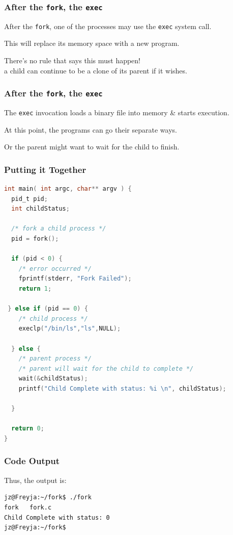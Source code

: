 \begin{frame}
	\frametitle{After the \texttt{fork}, the \texttt{exec}}


	After the \texttt{fork}, one of the processes may use the \texttt{exec} system call.

	This will replace its memory space with a new program.

	There's no rule that says this must happen!\\
	\quad a child can continue to be a clone of its parent if it wishes.
	
\end{frame}

\begin{frame}
	\frametitle{After the \texttt{fork}, the \texttt{exec}}


	The \texttt{exec} invocation loads a binary file into memory \& starts execution.

	At this point, the programs can go their separate ways.

	Or the parent might want to wait for the child to finish.


\end{frame}

\begin{frame}[fragile]
	\frametitle{Putting it Together}

	{\scriptsize
		\begin{lstlisting}[language=C]
int main( int argc, char** argv ) {
  pid_t pid;
  int childStatus;

  /* fork a child process */
  pid = fork();
  
  if (pid < 0) { 
    /* error occurred */ 
    fprintf(stderr, "Fork Failed"); 
    return 1;
  
 } else if (pid == 0) {    
    /* child process */
    execlp("/bin/ls","ls",NULL);
    
  } else {    
    /* parent process */
    /* parent will wait for the child to complete */
    wait(&childStatus);
    printf("Child Complete with status: %i \n", childStatus);
    
  }
    
  return 0;
}
\end{lstlisting}
	}

\end{frame}

\begin{frame}[fragile]
	\frametitle{Code Output}

	Thus, the output is:
	\begin{verbatim}
jz@Freyja:~/fork$ ./fork 
fork   fork.c
Child Complete with status: 0
jz@Freyja:~/fork$ 
\end{verbatim}


\end{frame}

